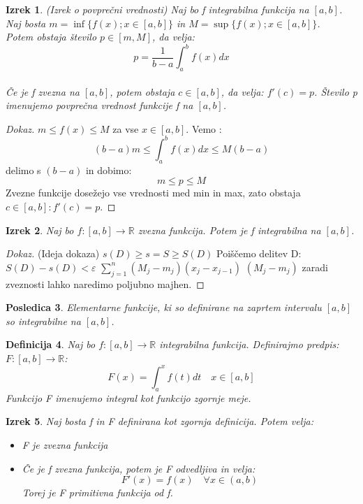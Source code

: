 \documentclass[11pt]{article}
\newtheorem{Izrek}{{\sc Izrek}}[section]
\newtheorem{Posledica}[Izrek]{{\sc Posledica}}
\newtheorem{Definicija}[Izrek]{{\sc Definicija}}
\newenvironment{dokaz}[1][{\sc Dokaz}]{\begin{proof}[#1]\renewcommand*{\qedsymbol}{\(\blacksquare\)}}{\end{proof}}
\begin{document}
\begin{Izrek}
	(Izrek o povprečni vrednosti) 
	Naj bo f integrabilna funkcija na $[a,b]$.
	Naj bosta $m = \inf\{f(x); x\in[a,b]\}$ in 
	$M = \sup\{f(x); x\in[a,b]\}$.
	\\
	Potem obstaja število $p\in [m,M]$, da velja:
	$$p = \frac{1}{b - a}\int_{a}^{b}{f(x)dx}$$
	\\
	Če je f zvezna na $[a,b]$, potem obstaja $c\in [a,b]$, da velja: $f'(c) = p$.
	Število p imenujemo povprečna vrednost funkcije f na $[a,b]$.
\end{Izrek}
\begin{dokaz}
	 $m\le f(x) \le M$ za vse $x\in [a,b]$.
	 \newline
	 Vemo : $$(b-a) m \le \int_{a}^{b}{ f(x) dx} \le M(b-a)$$ delimo s $(b-a)$ in dobimo:
	 \newline
	 $$m \le p\le M$$
	 \newline
	 Zvezne funkcije dosežejo vse vrednosti med min in max, zato obstaja $c\in[a,b]: f'(c) = p$.
\end{dokaz}
\begin{Izrek}
	Naj bo $f:  [a,b]\to \mathbb{R}$ zvezna funkcija. Potem je f integrabilna na $[a,b]$.
\end{Izrek}
\begin{dokaz}
	(Ideja dokaza)
	$s(D) \ge s = S \ge S(D)$
	\newline
	Poiščemo delitev D:
	$S(D) - s(D) < \varepsilon$
	\newline
	$\sum_{j = 1}^{n}{(M_j - m_j)(x_j - x_{j-1})}$
	\newline
	$(M_j - m_j)$ zaradi zveznosti lahko naredimo poljubno majhen.
\end{dokaz}
\begin{Posledica}
	Elementarne funkcije, ki so definirane na zaprtem intervalu $[a,b]$ so integrabilne na $[a,b]$.
\end{Posledica}
\begin{Definicija}
	Naj bo $f:[a,b]\to \mathbb{R}$ integrabilna funkcija. Definirajmo predpis: $F:[a,b]\to \mathbb{R}$:
	$$F(x) = \int_{a}^{x}{f(t)dt} \quad x\in[a,b]$$
	Funkcijo F imenujemo integral kot funkcijo zgornje meje.
\end{Definicija}
\begin{Izrek}
	Naj bosta f in F definirana kot zgornja definicija. Potem velja:
	\begin{itemize}
		\item 
		F je zvezna funkcija
		\item 
		Če je f zvezna funkcija, potem je F odvedljiva in velja:
		$$F'(x) =f(x) \quad \forall x\in(a,b)$$ Torej je F primitivna funkcija od f.
	\end{itemize}
\end{Izrek}
\end{document}
